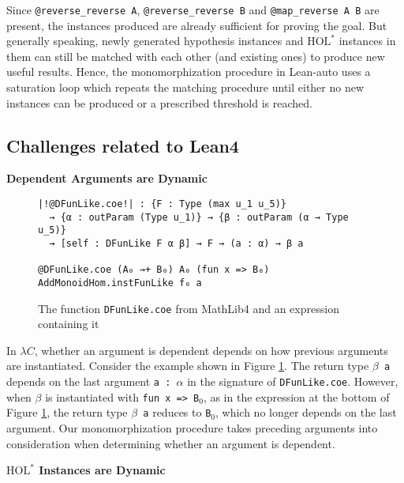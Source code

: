 Since \texttt{@reverse\_reverse A}, \texttt{@reverse\_reverse B} and \texttt{@map\_reverse A B}
are present, the instances produced are already sufficient for proving the goal.
But generally speaking, newly generated hypothesis instances and $\text{HOL}^*$ instances
in them can still be matched with each other (and existing ones) to produce new useful results.
Hence, the monomorphization procedure in Lean-auto uses a saturation loop which
repeats the matching procedure until either no new instances can be produced or a prescribed
threshold is reached.

\subsection{Challenges related to Lean4} \label{exqdet}

\noindent \textbf{Dependent Arguments are Dynamic}

\begin{figure}
  \begin{CenteredBox}
    \begin{lstlisting}[style=leanHH]
|!@DFunLike.coe!| : {F : Type (max u_1 u_5)}
  → {α : outParam (Type u_1)} → {β : outParam (α → Type u_5)}
  → [self : DFunLike F α β] → F → (a : α) → β a

@DFunLike.coe (A₀ →+ B₀) A₀ (fun x => B₀) AddMonoidHom.instFunLike f₀ a 
    \end{lstlisting}
  \end{CenteredBox}
  \caption{The function \texttt{DFunLike.coe} from MathLib4 and an expression
  containing it}
  \label{dfun}
\end{figure}

  In $\lambda C$, whether an argument is dependent depends on how previous arguments
are instantiated. Consider the example shown in Figure \ref{dfun}. The return
type \texttt{$\beta$ a} depends on the last argument \texttt{a : $\alpha$} in the signature of
\texttt{DFunLike.coe}. However, when $\beta$ is instantiated with \texttt{fun x => B$_0$}, as in the
expression at the bottom of Figure \ref{dfun}, the return type \texttt{$\beta$ a} reduces to \texttt{B$_0$},
which no longer depends on the last argument. Our monomorphization procedure takes preceding arguments into
consideration when determining whether an argument is dependent.

\noindent \textbf{$\text{HOL}^*$ Instances are Dynamic}


